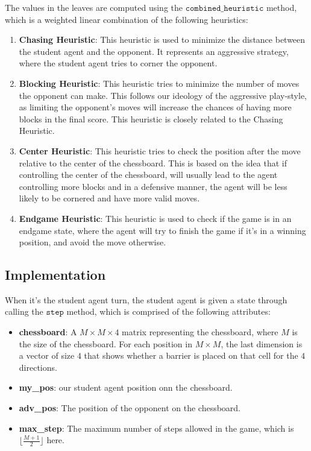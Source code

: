\documentclass[11pt]{article}
\begin{document}
The values in the leaves are computed using the $\texttt{combined\_heuristic}$ method, which is a weighted linear combination of the following heuristics:
\begin{enumerate}
    \item \textbf{Chasing Heuristic}: This heuristic is used to minimize the distance between the student agent and the opponent. It represents an aggressive strategy, where the student agent tries to corner the opponent.
    \item \textbf{Blocking Heuristic}: This heuristic tries to minimize the number of moves the opponent can make. This follows our ideology of the aggressive play-style, as limiting the opponent's moves will
    increase the chances of having more blocks in the final score. This heuristic is closely related to the Chasing Heuristic.
    \item \textbf{Center Heuristic}: This heuristic tries to check the position after the move relative to the center of the chessboard. This is based on the idea that if controlling the center of the chessboard,
    will usually lead to the agent controlling more blocks and in a defensive manner, the agent will be less likely to be cornered and have more valid moves.
    \item \textbf{Endgame Heuristic}: This heuristic is used to check if the game is in an endgame state, where the agent will try to finish the game if it's in a winning position, and avoid the move otherwise.
\end{enumerate}

\subsection{Implementation}
When it's the student agent turn, the student agent is given a state through calling the $\texttt{step}$ method, which is comprised of the following attributes:
\begin{itemize}
    \item \textbf{chessboard}: A $M\times M \times 4$ matrix representing the chessboard, where $M$ is the size of the chessboard. For each position in $M \times M$, the last dimension is a vector of size $4$ that shows whether a barrier is placed on that cell for the $4$ directions.
    \item \textbf{my\_pos}: our student agent position onn the chessboard.
    \item \textbf{adv\_pos}: The position of the opponent on the chessboard.
    \item \textbf{max\_step}: The maximum number of steps allowed in the game, which is $\lfloor \frac{M+1}{2} \rfloor$ here.
\end{itemize}
\end{document}
